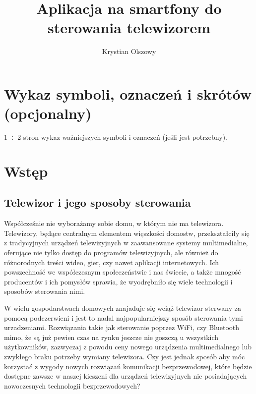 \documentclass[12pt,twoside]{article}
\author{Krystian Olszowy}
\title{Aplikacja na smartfony do sterowania telewizorem}
\begin{document}
\maketitle

\blankpage

\tableofcontents

\clearpage
\blankpage


\section*{Wykaz symboli, oznaczeń i skrótów (opcjonalny)}
%

1 $\div$ 2 stron wykaz ważniejszych symboli i oznaczeń (jeśli jest potrzebny).
\clearpage

\section{Wstęp}
\subsection{Telewizor i jego sposoby sterowania}
{Współcześnie nie wyborażamy sobie domu, w którym nie ma telewizora. Telewizory, będące 
centralnym elementem więszkości domostw, przekształciły się z tradycyjnych urządzeń 
telewizyjnych w zaawansowane systemy multimedialne, oferujące nie tylko dostęp do programów telewizyjnych,
ale również do różnorodnych treści wideo, gier, czy nawet aplikacji internetowych. 
Ich powszechność we współczesnym społeczeństwie i nas świecie, a także mnogość producentów i ich pomysłów 
sprawia, że wyodrębniło się wiele technologii i sposobów sterowania nimi.

W wielu gospodarstwach domowych znajaduje się wciąż telewizor sterwany za pomocą podczerwieni i jest
 to nadal najpopularniejszy sposób sterowania tymi urzadzeniami. Rozwiązania takie jak sterowanie poprzez WiFi, czy Bluetooth
 mimo, że są już pewien czas na rynku jeszcze nie goszczą u wszystkich użytkowników, zazwyczaj z powodu ceny
 nowego urządzenia multimedialnego lub zwykłego braku potrzeby wymiany telewizora. Czy jest jednak sposób aby
móc korzystać z wygody nowych rozwiązań komunikacji bezprzewodowej, które będzie dostępne zawsze w naszej kieszeni 
dla urządzeń telewizyjnych nie posiadających nowoczesnych technologii bezprzewodowych?
}
\end{document}
